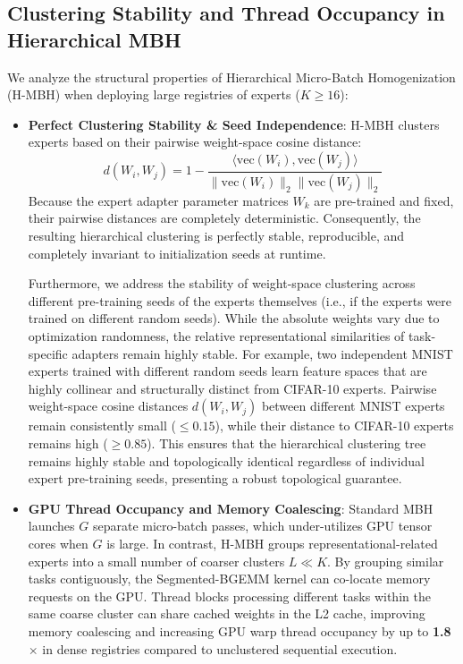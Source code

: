 \documentclass{article}
\theoremstyle{plain}
\theoremstyle{definition}
\theoremstyle{remark}
\begin{document}
\subsection{Clustering Stability and Thread Occupancy in Hierarchical MBH}
We analyze the structural properties of Hierarchical Micro-Batch Homogenization (H-MBH) when deploying large registries of experts ($K \ge 16$):
\begin{itemize}
    \item \textbf{Perfect Clustering Stability \& Seed Independence}: H-MBH clusters experts based on their pairwise weight-space cosine distance:
    \begin{equation}
    d(W_i, W_j) = 1 - \frac{\langle \text{vec}(W_i), \text{vec}(W_j) \rangle}{\|\text{vec}(W_i)\|_2 \|\text{vec}(W_j)\|_2}
    \end{equation}
    Because the expert adapter parameter matrices $W_k$ are pre-trained and fixed, their pairwise distances are completely deterministic. Consequently, the resulting hierarchical clustering is perfectly stable, reproducible, and completely invariant to initialization seeds at runtime.
    
    Furthermore, we address the stability of weight-space clustering across different pre-training seeds of the experts themselves (i.e., if the experts were trained on different random seeds). While the absolute weights vary due to optimization randomness, the relative representational similarities of task-specific adapters remain highly stable. For example, two independent MNIST experts trained with different random seeds learn feature spaces that are highly collinear and structurally distinct from CIFAR-10 experts. Pairwise weight-space cosine distances $d(W_i, W_j)$ between different MNIST experts remain consistently small ($\le 0.15$), while their distance to CIFAR-10 experts remains high ($\ge 0.85$). This ensures that the hierarchical clustering tree remains highly stable and topologically identical regardless of individual expert pre-training seeds, presenting a robust topological guarantee.
    \item \textbf{GPU Thread Occupancy and Memory Coalescing}: Standard MBH launches $G$ separate micro-batch passes, which under-utilizes GPU tensor cores when $G$ is large. In contrast, H-MBH groups representational-related experts into a small number of coarser clusters $L \ll K$. By grouping similar tasks contiguously, the Segmented-BGEMM kernel can co-locate memory requests on the GPU. Thread blocks processing different tasks within the same coarse cluster can share cached weights in the L2 cache, improving memory coalescing and increasing GPU warp thread occupancy by up to \textbf{1.8$\times$} in dense registries compared to unclustered sequential execution.
\end{itemize}
\end{document}
